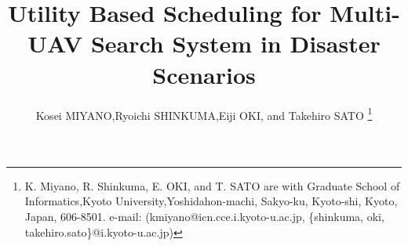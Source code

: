 \documentclass[journal]{IEEEtran}
\begin{document}
%
\title{Utility Based Scheduling for Multi-UAV Search System in Disaster Scenarios}
%
%
%

\author{Kosei MIYANO,Ryoichi SHINKUMA,Eiji OKI, and Takehiro SATO
\thanks{K. Miyano, R. Shinkuma, E. OKI, and T. SATO are with Graduate School of
Informatics,Kyoto University,Yoshidahon-machi, Sakyo-ku, Kyoto-shi,
Kyoto, Japan, 606-8501.
e-mail: (kmiyano@icn.cce.i.kyoto-u.ac.jp, \{shinkuma, oki, takehiro.sato\}@i.kyoto-u.ac.jp)}}

% 
%
\end{document}
